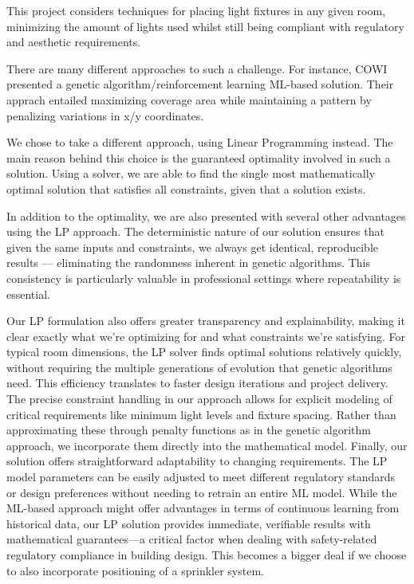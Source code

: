 \documentclass{article}
\begin{document}
This project considers techniques for placing light fixtures in any given room, 
minimizing the amount of lights used whilst still being compliant with regulatory
and aesthetic requirements.

There are many different approaches to such a challenge. For instance, COWI presented
a genetic algorithm/reinforcement learning ML-based solution. Their apprach 
entailed maximizing coverage area while maintaining a pattern by penalizing variations
in x/y coordinates. 

We chose to take a different approach, using Linear Programming instead. The main reason
behind this choice is the guaranteed optimality involved in such a solution.
Using a solver, we are able to find the single most mathematically optimal solution 
that satisfies all constraints, given that a solution exists.

In addition to the optimality, we are also presented with several other advantages 
using the LP approach. The deterministic nature of our solution ensures that given 
the same inputs and constraints, we always get identical, reproducible 
results — eliminating the randomness inherent in genetic algorithms. This 
consistency is particularly valuable in professional settings where repeatability 
is essential.

Our LP formulation also offers greater transparency and explainability, making it 
clear exactly what we're optimizing for and what constraints we're satisfying. 
For typical room dimensions, the LP solver finds optimal solutions relatively quickly, 
without requiring the multiple generations of evolution that genetic algorithms need. 
This efficiency translates to faster design iterations and project delivery.
The precise constraint handling in our approach allows for explicit modeling of 
critical requirements like minimum light levels and fixture spacing. Rather than 
approximating these through penalty functions as in the genetic algorithm approach, 
we incorporate them directly into the mathematical model.
Finally, our solution offers straightforward adaptability to changing requirements. 
The LP model parameters can be easily adjusted to meet different regulatory 
standards or design preferences without needing to retrain an entire ML model. 
While the ML-based approach might offer advantages in terms of continuous 
learning from historical data, our LP solution provides immediate, verifiable 
results with mathematical guarantees—a critical factor when dealing with 
safety-related regulatory compliance in building design. This becomes a bigger deal
if we choose to also incorporate positioning of a sprinkler system.
\end{document}
